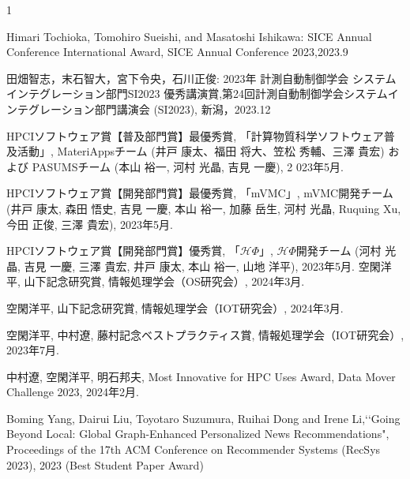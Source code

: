 \begin{受賞}{1}

Himari Tochioka, Tomohiro Sueishi, and Masatoshi Ishikawa: SICE Annual Conference International Award, SICE Annual Conference 2023,2023.9

田畑智志，末石智大，宮下令央，石川正俊: 2023年 計測自動制御学会 システムインテグレーション部門SI2023 優秀講演賞,第24回計測自動制御学会システムインテグレーション部門講演会 (SI2023), 新潟，2023.12

HPCIソフトウェア賞【普及部門賞】最優秀賞, 
「計算物質科学ソフトウェア普及活動」, 
MateriAppsチーム (井戸 康太、福田 将大、笠松 秀輔、三澤 貴宏) および PASUMSチーム (本山 裕一, 河村 光晶, 吉見 一慶), 2
023年5月.

HPCIソフトウェア賞【開発部門賞】最優秀賞,
「mVMC」, 
mVMC開発チーム (井戸 康太, 森田 悟史, 吉見 一慶, 本山 裕一, 加藤 岳生, 河村 光晶, Ruquing Xu, 今田 正俊, 三澤 貴宏), 
2023年5月.

HPCIソフトウェア賞【開発部門賞】優秀賞, 
「$\mathcal{H}\Phi$」, 
$\mathcal{H}\Phi$開発チーム (河村 光晶, 吉見 一慶, 三澤 貴宏, 井戸 康太, 本山 裕一, 山地 洋平), 
2023年5月.
空閑洋平, 山下記念研究賞, 情報処理学会（OS研究会）, 2024年3月.

空閑洋平, 山下記念研究賞, 情報処理学会（IOT研究会）, 2024年3月.

空閑洋平, 中村遼, 藤村記念ベストプラクティス賞, 情報処理学会（IOT研究会）, 2023年7月.

中村遼, 空閑洋平, 明石邦夫, Most Innovative for HPC Uses Award, Data Mover Challenge 2023, 2024年2月.


Boming Yang, Dairui Liu, Toyotaro Suzumura, Ruihai Dong and Irene Li,\lq\lq Going Beyond Local: Global Graph-Enhanced Personalized News Recommendations", Proceedings of the 17th ACM Conference on Recommender Systems  (RecSys 2023), 2023 (Best Student Paper Award)

\end{受賞}



